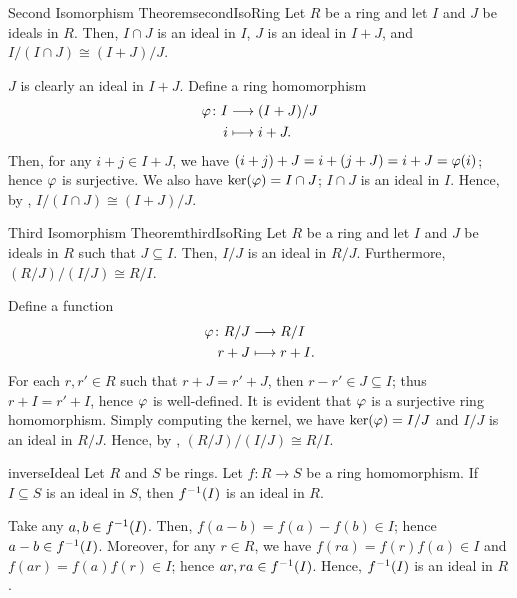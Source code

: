 \documentclass[../modern_algebra.tex]{subfiles}
\begin{document}
\begin{Theorem}{\textsf{Second Isomorphism Theorem}}{secondIsoRing}
    Let \(R\) be a ring and let \(I\) and \(J\) be ideals in \(R\).
    Then, \(I \cap J\) is an ideal in \(I\), \(J\) is an ideal in \(I + J\), and
    \(I/(I \cap J) \cong (I + J)/J\).
\end{Theorem}
\begin{myproof}[Proof]
    \(J\) is clearly an ideal in \(I + J\).
    Define a ring homomorphism
    \begin{align*}
        \varphi \colon I &\longrightarrow (I+J)/J \\
        i &\longmapsto i + J.
    \end{align*}
    Then, for any \(i + j \in I + J\), we have \((i + j) + J = i + (j + J) = i + J = \varphi(i)\);
    hence \(\varphi\) is surjective. We also have \(\ker(\varphi) = I \cap J\);
    \(I \cap J\) is an ideal in \(I\).
    Hence, by , \(I/(I \cap J) \cong (I+J)/J\).
\end{myproof}

\begin{Theorem}{\textsf{Third Isomorphism Theorem}}{thirdIsoRing}
    Let \(R\) be a ring and let \(I\) and \(J\) be ideals in \(R\) such that \(J \subseteq I\).
    Then, \(I/J\) is an ideal in \(R/J\). Furthermore, \((R/J)/(I/J) \cong R/I\).
\end{Theorem}
\begin{myproof}[Proof]
    Define a function
    \begin{align*}
        \varphi \colon R/J &\longrightarrow R/I \\
        r + J &\longmapsto r + I.
    \end{align*}
    For each \(r, r' \in R\) such that \(r + J = r' + J\), then \(r - r' \in J \subseteq I\);
    thus \(r + I = r' + I\), hence \(\varphi\) is well-defined.
    It is evident that \(\varphi\) is a surjective ring homomorphism.
    Simply computing the kernel, we have \(\ker(\varphi) = I/J\) and \(I/J\) is an ideal in \(R/J\).
    Hence, by , \((R/J)/(I/J) \cong R/I\).
\end{myproof}

\begin{Lemma}{}{inverseIdeal}
    Let \(R\) and \(S\) be rings.
    Let \(f \colon R \to S\) be a ring homomorphism.
    If \(I \subseteq S\) is an ideal in \(S\), then \(f^{-1}(I)\) is an ideal in \(R\).
\end{Lemma}
\begin{myproof}[Proof]
    Take any \(a, b \in f^{-1}(I)\).
    Then, \(f(a - b) = f(a) - f(b) \in I\); hence \(a - b \in f^{-1}(I)\).
    Moreover, for any \(r \in R\),
    we have \(f(ra) = f(r)f(a) \in I\) and \(f(ar) = f(a)f(r) \in I\); hence \(ar, ra \in f^{-1}(I)\).
    Hence, \(f^{-1}(I)\) is an ideal in \(R\).
\end{myproof}
\end{document}
